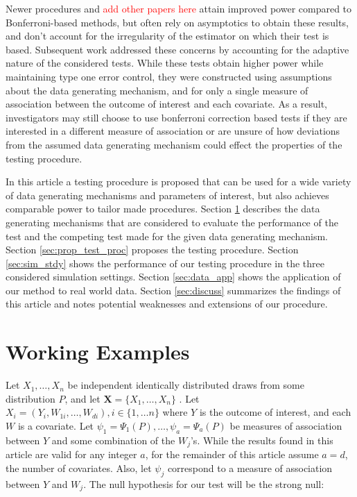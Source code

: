 \documentclass{article}
\newcommand{\sh}{\textcolor{red}}
\newcommand{\rvo}{X}
\newcommand{\disto}{P}
\begin{document}
Newer procedures \citep{donoho_higher_2004} and \sh{add other papers here} attain improved power compared to Bonferroni-based methods, but often rely on asymptotics to obtain these results, and don't account for the irregularity of the estimator on which their test is based.  Subsequent work \citep{mckeague_adaptive_2015, pan_powerful_2014, xu_adaptive_2016} addressed these concerns by accounting for the adaptive nature of the considered tests.  While these tests obtain higher power while maintaining type one error control, they were constructed using assumptions about the data generating mechanism, and for only a single measure of association between the outcome of interest and each covariate.  As a result, investigators may still choose to use bonferroni correction based tests if they are interested in a different measure of association or are unsure of how deviations from the assumed data generating mechanism could effect the properties of the testing procedure. 

In this article a testing procedure is proposed that can be used for a wide variety of data generating mechanisms and parameters of interest, but also achieves comparable power to tailor made procedures. Section \ref{sec:Working Examples} describes the data generating mechanisms that are considered to evaluate the performance of the test and the competing test made for the given data generating mechanism.  Section \ref{sec:prop_test_proc} proposes the testing procedure. Section \ref{sec:sim_stdy} shows the performance of our testing procedure in the three considered simulation settings. Section \ref{sec:data_app} shows the application of our method to real world data.  Section \ref{sec:discuss} summarizes the findings of this article and notes potential weaknesses and extensions of our procedure.

\section{Working Examples}
\label{sec:Working Examples}
Let $\rvo_1, \dots, \rvo_n$ be independent identically distributed draws from some distribution $\disto$, and let $\boldsymbol{\rvo} = \{\rvo_1, \dots, \rvo_n\}$ . Let $\rvo_i = \left(Y_i, W_{1 i}, \dots, W_{d i}\right), i \in \{1, \dots n\}$ where $Y$ is the outcome of interest, and each $W$ is a covariate. Let $\psi_1 = \Psi_1(\disto), \dots, \psi_a = \Psi_a(\disto)$ be measures of association between $Y$ and some combination of the $W_j$'s.  While the results found in this article are valid for any integer $a$, for the remainder of this article assume $a = d$, the number of covariates. Also, let $\psi_j$ correspond to a measure of association between $Y$ and $W_j$.  The null hypothesis for our test will be the strong null: 
\end{document}
